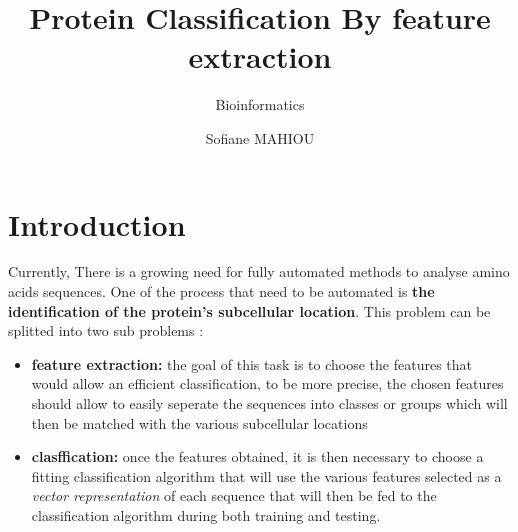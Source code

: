 \documentclass{bioinfo}
\begin{document}
 

\subtitle{Bioinformatics}

\title[short Title]{Protein Classification By feature extraction}
\author[Sample \textit{et~al}.]{Sofiane MAHIOU}
\address{Computer Science, UCL, London, WC1E 6BT, UK}

\corresp{}

\history{}

\editor{}


\maketitle

\section{Introduction}

Currently, There is a growing need for fully automated methods to analyse amino acids sequences. One of the process that need to be automated is \textbf{the identification of the protein's subcellular location}. This problem can be splitted into two sub problems :\\
\begin{itemize}
	\item \textbf{feature extraction: } the goal of this task is to choose the features that would allow an efficient classification, to be more precise, the chosen features should allow to easily seperate the sequences into classes or groups which will then be matched with the various subcellular locations 
	\item \textbf{clasffication: } once the features obtained, it is then necessary to choose a fitting classification algorithm that will use the various features selected as a \textit{vector representation} of each sequence that will then be fed to the classification algorithm during both training and testing.
\end{itemize}
\end{document}
